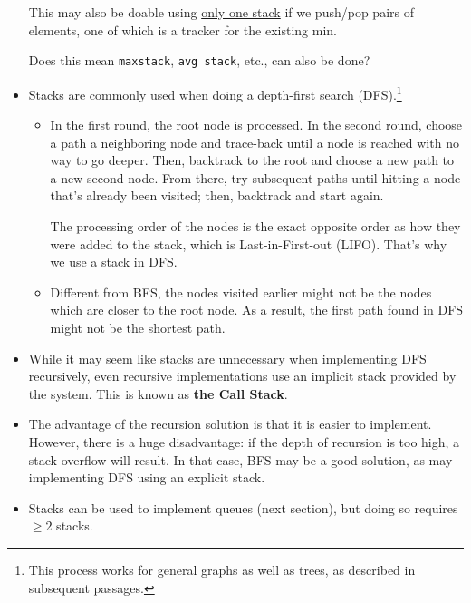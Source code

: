 \documentclass[12pt]{article}
\begin{document}
\begin{itemize}
		This may also be doable using \href{https://leetcode.com/problems/min-stack/discuss/2281796/C%2B%2B-One-stack-Solution}{only one stack} if we push/pop pairs of elements, one of which is a tracker for the existing min.
		
		Does this mean \texttt{maxstack}, \texttt{avg stack}, etc., can also be done? 
		
		\item Stacks are commonly used when doing a depth-first search (DFS).\footnote{This process works for general graphs as well as trees, as described in subsequent passages.}
		\begin{itemize}
			\item In the first round, the root node is processed. In the second round, choose a path a neighboring node and trace-back until a node is reached with no way to go deeper. Then, backtrack to the root and choose a new path to a new second node. From there, try subsequent paths until hitting a node that's already been visited; then, backtrack and start again.
			
			The processing order of the nodes is the exact opposite order as how they were added to the stack, which is Last-in-First-out (LIFO). That's why we use a stack in DFS.
			
			\item Different from BFS, the nodes visited earlier might not be the nodes which are closer to the root node. As a result, the first path found in DFS might not be the shortest path.
		\end{itemize}
		\item While it may seem like stacks are unnecessary when implementing DFS recursively, even recursive implementations use an implicit stack provided by the system. This is known as \textbf{the Call Stack}.
		
		\item The advantage of the recursion solution is that it is easier to implement. However, there is a huge disadvantage: if the depth of recursion is too high, a stack overflow will result. In that case, BFS may be a good solution, as may implementing DFS using an explicit stack.
		
		\item Stacks can be used to implement queues (next section), but doing so requires $\geq 2$ stacks.
	\end{itemize}
\end{document}
